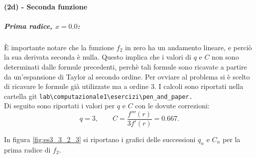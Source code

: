 \documentclass[letterpaper, 12pt]{article}
\begin{document}
\paragraph{(2d) - Seconda funzione}
\subparagraph{Prima radice, $x = 0.0$: }
È importante notare che la funzione $f_2$ in zero ha un andamento lineare, e perciò la sua derivata seconda è 
nulla. Questo implica che i valori di $q$ e $C$ non sono determinati dalle formule precedenti, perchè tali 
formule sono ricavate a partire da un'espansione di Taylor al secondo ordine. Per ovviare al problema 
si è scelto di ricavare le formule già utilizzate ma a ordine 3. I calcoli sono riportati nella cartella git
\verb|lab\computazionale1\esercizi\pen_and_paper.| \\
Di seguito sono riportati i valori per $q$ e $C$ con le dovute correzioni:
\begin{equation}
    q = 3,
    \qquad
    C = \frac{ f'''(r)}{3 f'(r)} = 0.667.
\end{equation}

In figura \ref{fig:es3_3_2_3} si riportano i grafici delle successioni $q_n$ e $C_n$ per la prima radice di $f_2$.
\end{document}
